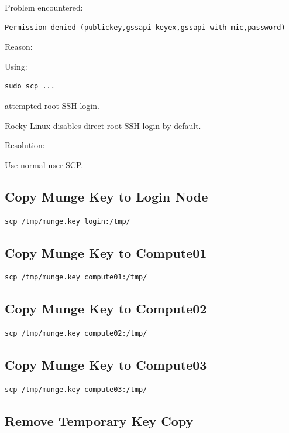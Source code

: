 \documentclass[11pt]{article}
\begin{document}
Problem encountered:

\begin{verbatim}
Permission denied (publickey,gssapi-keyex,gssapi-with-mic,password)
\end{verbatim}

Reason:

Using:

\begin{verbatim}
sudo scp ...
\end{verbatim}

attempted root SSH login.

Rocky Linux disables direct root SSH login by default.

Resolution:

Use normal user SCP.
\subsection{Copy Munge Key to Login Node}
\label{sec:orge9e7605}

\begin{verbatim}
scp /tmp/munge.key login:/tmp/
\end{verbatim}
\subsection{Copy Munge Key to Compute01}
\label{sec:org6a14a87}

\begin{verbatim}
scp /tmp/munge.key compute01:/tmp/
\end{verbatim}
\subsection{Copy Munge Key to Compute02}
\label{sec:org45b2432}

\begin{verbatim}
scp /tmp/munge.key compute02:/tmp/
\end{verbatim}
\subsection{Copy Munge Key to Compute03}
\label{sec:org09666f3}

\begin{verbatim}
scp /tmp/munge.key compute03:/tmp/
\end{verbatim}
\subsection{Remove Temporary Key Copy}
\label{sec:orgc3e5142}
\end{document}
